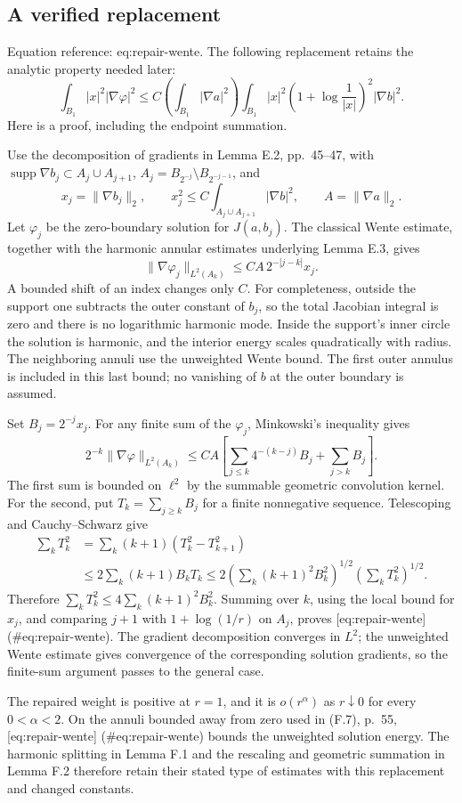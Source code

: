 \documentclass[10pt]{article}
\begin{document}
\subsection*{A verified replacement}
Equation reference: eq:repair-wente. The following replacement retains the analytic property needed later: \[
 \int_{B_1}|x|^2|\nabla\varphi|^2
 \le C\left(\int_{B_1}|\nabla a|^2\right)
       \int_{B_1}|x|^2
       \left(1+\log\frac1{|x|}\right)^2|\nabla b|^2.\] Here is a proof, including the endpoint summation.\par
Use the decomposition of gradients in Lemma E.2, pp. 45–47, with \(\operatorname{supp}\nabla b_j\subset A_j\cup A_{j+1}\), \(A_j=B_{2^{-j}}\setminus B_{2^{-j-1}}\), and \[x_j=\|\nabla b_j\|_2,\qquad
 x_j^2\le C\int_{A_j\cup A_{j+1}}|\nabla b|^2,\qquad
 A=\|\nabla a\|_2.\] Let \(\varphi_j\) be the zero-boundary solution for \(J(a,b_j)\). The classical Wente estimate, together with the harmonic annular estimates underlying Lemma E.3, gives \[\|\nabla\varphi_j\|_{L^2(A_k)}
 \le CA\,2^{-|j-k|}x_j .\] A bounded shift of an index changes only \(C\). For completeness, outside the support one subtracts the outer constant of \(b_j\), so the total Jacobian integral is zero and there is no logarithmic harmonic mode. Inside the support’s inner circle the solution is harmonic, and the interior energy scales quadratically with radius. The neighboring annuli use the unweighted Wente bound. The first outer annulus is included in this last bound; no vanishing of \(b\) at the outer boundary is assumed.\par
Set \(B_j=2^{-j}x_j\). For any finite sum of the \(\varphi_j\), Minkowski’s inequality gives \[2^{-k}\|\nabla\varphi\|_{L^2(A_k)}
 \le CA\left[
       \sum_{j\le k}4^{-(k-j)}B_j+\sum_{j>k}B_j\right].\] The first sum is bounded on \(\ell^2\) by the summable geometric convolution kernel. For the second, put \(T_k=\sum_{j\ge k}B_j\) for a finite nonnegative sequence. Telescoping and Cauchy–Schwarz give \[\begin{aligned}
 \sum_kT_k^2
 &=\sum_k(k+1)(T_k^2-T_{k+1}^2)\\
 &\le2\sum_k(k+1)B_kT_k
 \le2\left(\sum_k(k+1)^2B_k^2\right)^{1/2}
       \left(\sum_kT_k^2\right)^{1/2}.\end{aligned}\] Therefore \(\sum_kT_k^2\le4\sum_k(k+1)^2B_k^2\). Summing over \(k\), using the local bound for \(x_j\), and comparing \(j+1\) with \(1+\log(1/r)\) on \(A_j\), proves [eq:repair-wente] (\#eq:repair-wente). The gradient decomposition converges in \(L^2\); the unweighted Wente estimate gives convergence of the corresponding solution gradients, so the finite-sum argument passes to the general case.\par
The repaired weight is positive at \(r=1\), and it is \(o(r^\alpha)\) as \(r\downarrow0\) for every \(0<\alpha<2\). On the annuli bounded away from zero used in (F.7), p. 55, [eq:repair-wente] (\#eq:repair-wente) bounds the unweighted solution energy. The harmonic splitting in Lemma F.1 and the rescaling and geometric summation in Lemma F.2 therefore retain their stated type of estimates with this replacement and changed constants.\par
\end{document}
